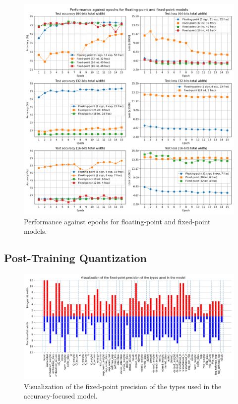 \begin{figure}[hpt!]
  \centering
  \includegraphics[trim={0cm 0cm 0cm 1.2cm}, clip, width=1.0\textwidth, center]{../logs/training_accuracy.png}
  \caption{Performance against epochs for floating-point and fixed-point models.}
  \label{fig:pre-training}
\end{figure}


\subsection{Post-Training Quantization}
\indo{|}
\indo{|}
\indo{|}
\indo{|}
\indo{|}

\begin{figure}[hpt!]
  \centering
  \includegraphics[trim={0cm 0cm 1cm 7.8mm}, clip, width=1.0\textwidth, center]{../logs/bit_width_visualization.png}
  \caption{Visualization of the fixed-point precision of the types used in the accuracy-focused model.}
  \label{fig:post-training-bit-widths}
\end{figure}
